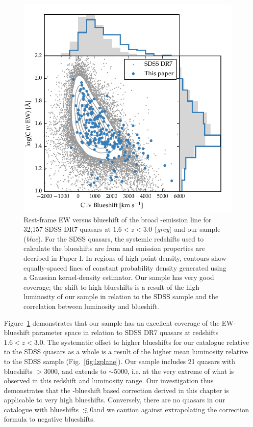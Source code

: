 \begin{figure}
    \includegraphics[width=\columnwidth]{figures/chapter03/civ_space.pdf} 
    \caption{Rest-frame EW versus blueshift of the broad -emission line for 32,157 SDSS DR7 quasars at $1.6 < z < 3.0$ ({\it grey}) and our sample ({\it blue}). For the SDSS quasars, the systemic redshifts used to calculate the blueshifts are from \citet{hewett10} and  emission properties are decribed in Paper I. In regions of high point-density, contours show equally-spaced lines of constant probability density generated using a Gaussian kernel-density estimator. Our sample has very good coverage; the shift to high blueshifts is a result of the high luminosity of our sample in relation to the SDSS sample and the correlation between luminosity and blueshift.} 
    \label{fig:civ_space}
\end{figure}

Figure~\ref{fig:civ_space} demonstrates that our sample has an excellent coverage of the EW-blueshift parameter space in relation to SDSS DR7 quasars at redshifts $1.6 < z < 3.0$. 
The systematic offset to higher  blueshifts for our catalogue relative to the SDSS quasars as a whole is a result of the higher mean luminosity relative to the SDSS sample (Fig.~\ref{fig:lzplane}).
Our sample includes 21 quasars with  blueshifts $>$3000\kms, and extends to $\sim$5000\kms, i.e. at the very extreme of what is observed in this redshift and luminosity range. 
Our investigation thus demonstrates that the -blueshift based correction derived in this chapter is applicable to very high blueshifts. 
Conversely, there are no quasars in our catalogue with  blueshifts $\lesssim$0\kms and we caution against extrapolating the correction formula to negative blueshifts. 

